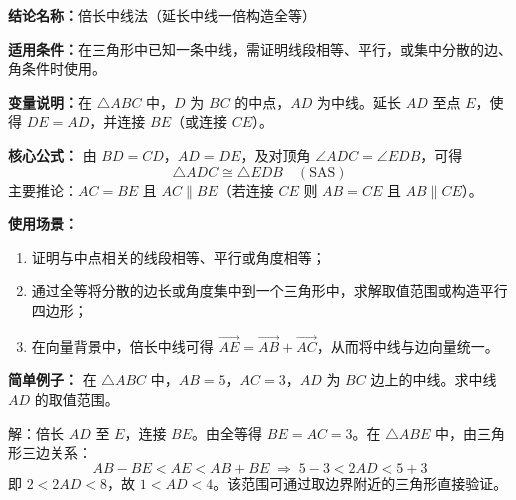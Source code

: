\textbf{结论名称：}倍长中线法（延长中线一倍构造全等）  

\textbf{适用条件：}在三角形中已知一条中线，需证明线段相等、平行，或集中分散的边、角条件时使用。  

\textbf{变量说明：}在 $\triangle ABC$ 中，$D$ 为 $BC$ 的中点，$AD$ 为中线。延长 $AD$ 至点 $E$，使得 $DE=AD$，并连接 $BE$（或连接 $CE$）。  

\textbf{核心公式：}  
由 $BD=CD$，$AD=DE$，及对顶角 $\angle ADC = \angle EDB$，可得  
\[
\boxed{\triangle ADC \cong \triangle EDB \quad (\text{SAS})}
\]
主要推论：$AC=BE$ 且 $AC \parallel BE$（若连接 $CE$ 则 $AB=CE$ 且 $AB\parallel CE$）。  

\textbf{使用场景：}  
\begin{enumerate}
\item 证明与中点相关的线段相等、平行或角度相等；
\item 通过全等将分散的边长或角度集中到一个三角形中，求解取值范围或构造平行四边形；
\item 在向量背景中，倍长中线可得 $\overrightarrow{AE}=\overrightarrow{AB}+\overrightarrow{AC}$，从而将中线与边向量统一。
\end{enumerate}

\textbf{简单例子：}  
在 $\triangle ABC$ 中，$AB=5$，$AC=3$，$AD$ 为 $BC$ 边上的中线。求中线 $AD$ 的取值范围。  

解：倍长 $AD$ 至 $E$，连接 $BE$。由全等得 $BE=AC=3$。在 $\triangle ABE$ 中，由三角形三边关系：  
\[
AB-BE < AE < AB+BE \;\Longrightarrow\; 5-3 < 2AD < 5+3
\]
即 $2 < 2AD < 8$，故 $\boxed{1 < AD < 4}$。该范围可通过取边界附近的三角形直接验证。